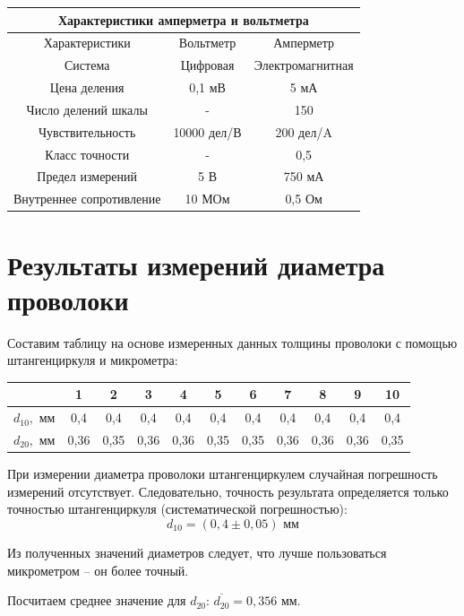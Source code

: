 \documentclass[a4paper, 12pt]{article} %
\begin{document}
\begin{center}
\begin{tabular}{|c|c|c|}
\hline 
\multicolumn{3}{|c|}{Характеристики амперметра и вольтметра} \\ 
\hline 
Характеристики & Вольтметр & Амперметр \\ 
\hline 
Система & Цифровая & Электромагнитная \\ 
\hline 
Цена деления & 0,1 мВ & 5 мА \\ 
\hline 
Число делений шкалы & - & 150 \\ 
\hline 
Чувствительность & 10000 дел/В & 200 дел/A \\ 
\hline 
Класс точности & - & 0,5 \\ 
\hline 
Предел измерений & 5 В & 750 мА \\ 
\hline 
Внутреннее сопротивление & 10 МОм & 0,5 Ом \\ 
\hline  
\end{tabular} 
\end{center} 
\newpage

\section{Результаты измерений диаметра проволоки}


Составим таблицу на основе измеренных данных толщины проволоки с помощью штангенциркуля и микрометра:

\begin{center}
\begin{tabular}{|c|c|c|c|c|c|c|c|c|c|c|}
\hline 
 & 1 & 2 & 3 & 4 & 5 & 6 & 7 & 8 & 9 & 10 \\ 
\hline 
$d_{10},$ мм & 0,4 & 0,4 & 0,4 & 0,4 & 0,4 & 0,4 & 0,4 & 0,4 & 0,4 & 0,4 \\ 
\hline 
$d_{20},$ мм & 0,36 & 0,35 & 0,36 & 0,36 & 0,35 & 0,35 & 0,36 & 0,36 & 0,36 & 0,35 \\ 
\hline 
\end{tabular} 
\end{center}

При измерении диаметра проволоки штангенциркулем случайная погрешность измерений отсутствует. Следовательно, точность результата определяется только точностью штангенциркуля (систематической погрешностью):
\[d_{10} = (0,4 \pm 0,05) \text{ мм}\]

Из полученных значений диаметров следует, что лучше пользоваться микрометром -- он более точный.

Посчитаем среднее значение для $d_{20}$: $\overline{d_{20}} = 0,356$ мм.
\end{document}
